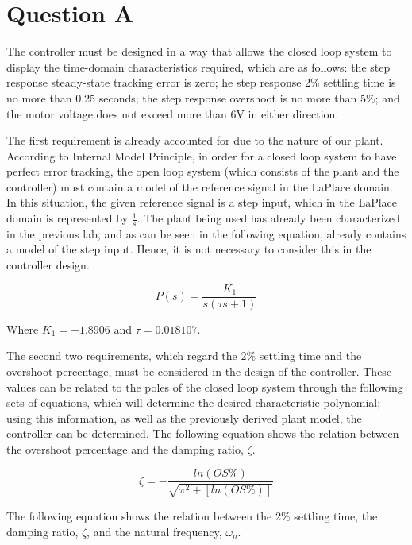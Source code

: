 \documentclass[11pt, letterpaper]{article}
\begin{document}
\section{Question A}
The controller must be designed in a way that allows the closed loop system to
display the time-domain characteristics required, which are as follows: the
step response steady-state tracking error is zero; he step response 2\%
settling time is no more than 0.25 seconds; the step response overshoot is no
more than 5\%; and the motor voltage does not exceed more than 6V in either
direction. \par
The first requirement is already accounted for due to the nature of our plant.
According to Internal Model Principle, in order for a closed loop system to have
perfect error tracking, the open loop system (which consists of the plant and the controller)
must contain a model of the reference signal in the LaPlace domain. In this situation, the
given reference signal is a step input, which in the LaPlace domain is represented
by $\frac{1}{s}$. The plant being used has already been characterized in the previous
lab, and as can be seen in the following equation, already contains a model of the step
input. Hence, it is not necessary to consider this in the controller design.

\begin{equation}
    P(s) = \frac{K_1}{s(\tau s + 1)}
\end{equation}

Where $K_1 = -1.8906$ and $\tau = 0.018107$.\par

The second two requirements, which regard the 2\% settling time and the overshoot percentage,
must be considered in the design of the controller. These values can be related to the poles
of the closed loop system through the following sets of equations, which will determine the
desired characteristic polynomial; using this information, as well as the previously derived
plant model, the controller can be determined. The following equation shows the relation between the overshoot
percentage and the damping ratio, $\zeta$.

\begin{equation}
    \zeta = - \frac{ln (OS\%)}{\sqrt{\pi^2 + [ln(OS\%)]}}
\end{equation}

The following equation shows the relation between the 2\% settling time, the damping ratio, $\zeta$,
and the natural frequency, $\omega_n$.
\end{document}

